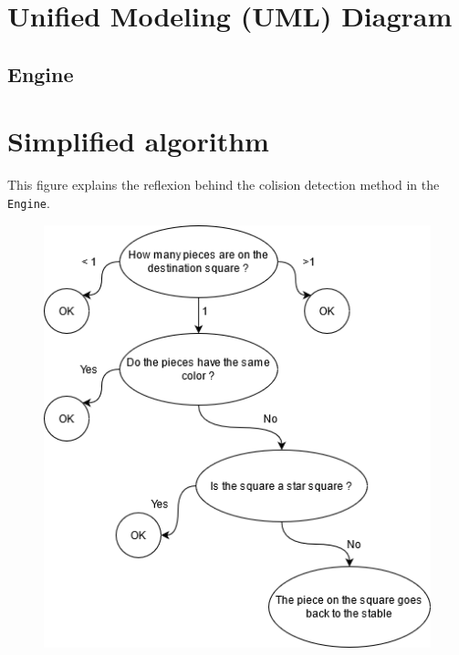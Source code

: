 \documentclass[english, 11pt, titlepage]{article}
\begin{document}
    \label{section:translating_coordinates}

    \pagebreak
    \appendix
    \appendixpage
    \addappheadtotoc
    \section{Unified Modeling (UML) Diagram}
    \subsection{Engine}

    \pagebreak
    \section{Simplified algorithm}
    \label{app:algorithm}
    This figure explains the reflexion behind the colision detection method in the \verb|Engine|.
    \begin{figure}[h]
        \centering
        \vspace{0.3cm}
        \includegraphics{Logigram.png}
    \end{figure}
    
\end{document}
